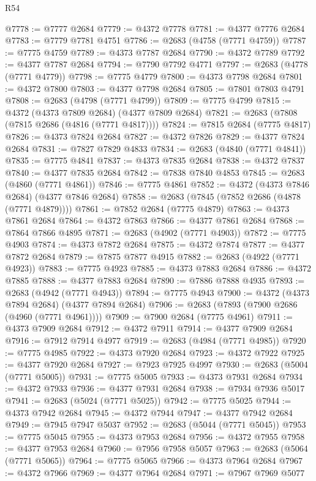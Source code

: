 \begin{lexlean}{R54}
\begin{coremodule}
@7778 := @7777 @2684
@7779 := @4372 @7778
@7781 := @4377 @7776 @2684
@7783 := @7779 @7781 @4751
@7786 := @2683 (@4758 (@7771 @4759))
@7787 := @7775 @4759
@7789 := @4373 @7787 @2684
@7790 := @4372 @7789
@7792 := @4377 @7787 @2684
@7794 := @7790 @7792 @4771
@7797 := @2683 (@4778 (@7771 @4779))
@7798 := @7775 @4779
@7800 := @4373 @7798 @2684
@7801 := @4372 @7800
@7803 := @4377 @7798 @2684
@7805 := @7801 @7803 @4791
@7808 := @2683 (@4798 (@7771 @4799))
@7809 := @7775 @4799
@7815 := @4372 (@4373 @7809 @2684) (@4377 @7809 @2684)
@7821 := @2683 (@7808 (@7815 @2686 (@4816 (@7771 @4817))))
@7824 := @7815 @2684 (@7775 @4817)
@7826 := @4373 @7824 @2684
@7827 := @4372 @7826
@7829 := @4377 @7824 @2684
@7831 := @7827 @7829 @4833
@7834 := @2683 (@4840 (@7771 @4841))
@7835 := @7775 @4841
@7837 := @4373 @7835 @2684
@7838 := @4372 @7837
@7840 := @4377 @7835 @2684
@7842 := @7838 @7840 @4853
@7845 := @2683 (@4860 (@7771 @4861))
@7846 := @7775 @4861
@7852 := @4372 (@4373 @7846 @2684) (@4377 @7846 @2684)
@7858 := @2683 (@7845 (@7852 @2686 (@4878 (@7771 @4879))))
@7861 := @7852 @2684 (@7775 @4879)
@7863 := @4373 @7861 @2684
@7864 := @4372 @7863
@7866 := @4377 @7861 @2684
@7868 := @7864 @7866 @4895
@7871 := @2683 (@4902 (@7771 @4903))
@7872 := @7775 @4903
@7874 := @4373 @7872 @2684
@7875 := @4372 @7874
@7877 := @4377 @7872 @2684
@7879 := @7875 @7877 @4915
@7882 := @2683 (@4922 (@7771 @4923))
@7883 := @7775 @4923
@7885 := @4373 @7883 @2684
@7886 := @4372 @7885
@7888 := @4377 @7883 @2684
@7890 := @7886 @7888 @4935
@7893 := @2683 (@4942 (@7771 @4943))
@7894 := @7775 @4943
@7900 := @4372 (@4373 @7894 @2684) (@4377 @7894 @2684)
@7906 := @2683 (@7893 (@7900 @2686 (@4960 (@7771 @4961))))
@7909 := @7900 @2684 (@7775 @4961)
@7911 := @4373 @7909 @2684
@7912 := @4372 @7911
@7914 := @4377 @7909 @2684
@7916 := @7912 @7914 @4977
@7919 := @2683 (@4984 (@7771 @4985))
@7920 := @7775 @4985
@7922 := @4373 @7920 @2684
@7923 := @4372 @7922
@7925 := @4377 @7920 @2684
@7927 := @7923 @7925 @4997
@7930 := @2683 (@5004 (@7771 @5005))
@7931 := @7775 @5005
@7933 := @4373 @7931 @2684
@7934 := @4372 @7933
@7936 := @4377 @7931 @2684
@7938 := @7934 @7936 @5017
@7941 := @2683 (@5024 (@7771 @5025))
@7942 := @7775 @5025
@7944 := @4373 @7942 @2684
@7945 := @4372 @7944
@7947 := @4377 @7942 @2684
@7949 := @7945 @7947 @5037
@7952 := @2683 (@5044 (@7771 @5045))
@7953 := @7775 @5045
@7955 := @4373 @7953 @2684
@7956 := @4372 @7955
@7958 := @4377 @7953 @2684
@7960 := @7956 @7958 @5057
@7963 := @2683 (@5064 (@7771 @5065))
@7964 := @7775 @5065
@7966 := @4373 @7964 @2684
@7967 := @4372 @7966
@7969 := @4377 @7964 @2684
@7971 := @7967 @7969 @5077

\end{coremodule}
\end{lexlean}
